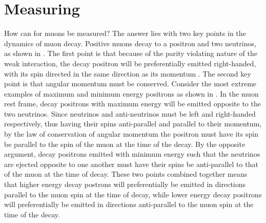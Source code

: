 \section{Measuring \texorpdfstring{\wa}{wa}}
\label{section:WaIntro}

How can \wa for muons be measured? The answer lies with two key points in the dynamics of muon decay. Positive muons decay to a positron and two neutrinos, as shown in . The first point is that because of the parity violating nature of the weak interaction, the decay positron will be preferentially emitted right-handed, with its spin directed in the same direction as its momentum \cite{Bucksbaum}. The second key point is that angular momentum must be conserved. Consider the most extreme examples of maximum and minimum energy positrons as shown in . In the muon rest frame, decay positrons with maximum energy will be emitted opposite to the two neutrinos. Since neutrinos and anti-neutrinos must be left and right-handed respectively, thus having their spins anti-parallel and parallel to their momentum, by the law of conservation of angular momentum the positron must have its spin be parallel to the spin of the muon at the time of the decay. By the opposite argument, decay positrons emitted with minimum energy such that the neutrinos are ejected opposite to one another must have their spins be anti-parallel to that of the muon at the time of decay. These two points combined together means that higher energy decay postrons will preferentially be emitted in directions parallel to the muon spin at the time of decay, while lower energy decay positrons will preferentially be emitted in directions anti-parallel to the muon spin at the time of the decay. 

